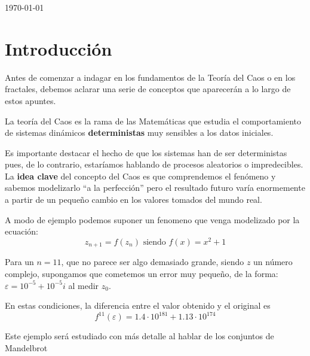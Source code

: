 \begin{titlepage}

{\large \today}\\[1cm] %



\vfill %

\end{titlepage}

\tableofcontents
\newpage

\section{Introducción}
Antes de comenzar a indagar en los fundamentos de la Teoría del Caos o en los fractales, debemos aclarar una serie de conceptos que aparecerán a lo largo de estos apuntes.

\begin{definition}
La teoría del Caos es la rama de las Matemáticas que estudia el comportamiento de sistemas dinámicos \textbf{deterministas} muy sensibles a los datos iniciales.
\end{definition}

Es importante destacar el hecho de que los sistemas han de ser deterministas pues, de lo contrario, estaríamos hablando de procesos aleatorios o impredecibles. La \textbf{idea clave} del concepto del Caos es que comprendemos el fenómeno y sabemos modelizarlo ``a la perfección'' pero el resultado futuro varía enormemente a partir de un pequeño cambio en los valores tomados del mundo real.

\begin{example}
A modo de ejemplo podemos suponer un fenomeno que venga modelizado por la ecuación:
\[z_{n+1} = f(z_n) \text{ siendo } f(x) = x^2+1\]

Para un $n=11$, que no parece ser algo demasiado grande, siendo $z$ un número complejo, supongamos que cometemos un error muy pequeño, de la forma: $ε=10^{-5}+10^{-5}i$ al medir $z_0$.

En estas condiciones, la diferencia entre el valor obtenido y el original es
\[f^{11}(ε)=1.4 \cdot 10^{181} + 1.13\cdot 10^{174}\]

Este ejemplo será estudiado con más detalle al hablar de los conjuntos de Mandelbrot
\end{example}

